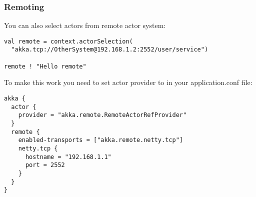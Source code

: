 \documentclass{beamer}
\begin{document}
\begin{frame}[fragile]
\frametitle{Remoting}
You can also select actors from remote actor system:
\begin{lstlisting}
val remote = context.actorSelection(
  "akka.tcp://OtherSystem@192.168.1.2:2552/user/service")

remote ! "Hello remote"
\end{lstlisting}
To make this work you need to set actor provider to 
in your application.conf file:
\begin{lstlisting}
akka {
  actor {
    provider = "akka.remote.RemoteActorRefProvider"
  }
  remote {
    enabled-transports = ["akka.remote.netty.tcp"]
    netty.tcp {
      hostname = "192.168.1.1"
      port = 2552
    }
  }
}
\end{lstlisting}
\end{frame}


\end{document}

